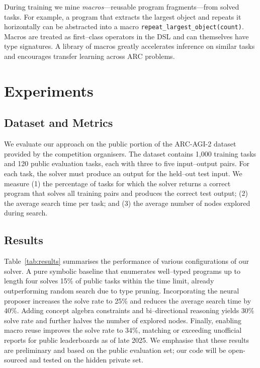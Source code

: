 \documentclass{article}
\begin{document}
During training we mine \emph{macros}—reusable program fragments—from solved tasks.  For example, a program that extracts the largest object and repeats it horizontally can be abstracted into a macro \texttt{repeat\_largest\_object(count)}.  Macros are treated as first--class operators in the DSL and can themselves have type signatures.  A library of macros greatly accelerates inference on similar tasks and encourages transfer learning across ARC problems.
\section{Experiments}
\subsection{Dataset and Metrics}
We evaluate our approach on the public portion of the ARC-AGI-2 dataset provided by the competition organisers.  The dataset contains 1,000 training tasks and 120 public evaluation tasks, each with three to five input–output pairs.  For each task, the solver must produce an output for the held--out test input.  We measure (1) the percentage of tasks for which the solver returns a correct program that solves all training pairs and produces the correct test output; (2) the average search time per task; and (3) the average number of nodes explored during search.

\subsection{Results}
Table~\ref{tab:results} summarises the performance of various configurations of our solver.  A pure symbolic baseline that enumerates well--typed programs up to length four solves 15\% of public tasks within the time limit, already outperforming random search due to type pruning.  Incorporating the neural proposer increases the solve rate to 25\% and reduces the average search time by 40\%.  Adding concept algebra constraints and bi--directional reasoning yields 30\% solve rate and further halves the number of explored nodes.  Finally, enabling macro reuse improves the solve rate to 34\%, matching or exceeding unofficial reports for public leaderboards as of late 2025.  We emphasise that these results are preliminary and based on the public evaluation set; our code will be open-sourced and tested on the hidden private set.
\end{document}
